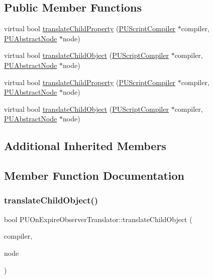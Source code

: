 \subsection*{Public Member Functions}
\begin{DoxyCompactItemize}
\item 
virtual bool \hyperlink{classPUOnExpireObserverTranslator_a5c9aebce494bfb736157931378f244a3}{translate\+Child\+Property} (\hyperlink{classPUScriptCompiler}{P\+U\+Script\+Compiler} $\ast$compiler, \hyperlink{classPUAbstractNode}{P\+U\+Abstract\+Node} $\ast$node)
\item 
virtual bool \hyperlink{classPUOnExpireObserverTranslator_ab390167f2b9750f6d6997c9c8fd87987}{translate\+Child\+Object} (\hyperlink{classPUScriptCompiler}{P\+U\+Script\+Compiler} $\ast$compiler, \hyperlink{classPUAbstractNode}{P\+U\+Abstract\+Node} $\ast$node)
\item 
virtual bool \hyperlink{classPUOnExpireObserverTranslator_aa547f9b3336637066998681d720af51e}{translate\+Child\+Property} (\hyperlink{classPUScriptCompiler}{P\+U\+Script\+Compiler} $\ast$compiler, \hyperlink{classPUAbstractNode}{P\+U\+Abstract\+Node} $\ast$node)
\item 
virtual bool \hyperlink{classPUOnExpireObserverTranslator_a5f14260b1fa1af6eea3a77904cec71f1}{translate\+Child\+Object} (\hyperlink{classPUScriptCompiler}{P\+U\+Script\+Compiler} $\ast$compiler, \hyperlink{classPUAbstractNode}{P\+U\+Abstract\+Node} $\ast$node)
\end{DoxyCompactItemize}
\subsection*{Additional Inherited Members}


\subsection{Member Function Documentation}
\mbox{\label{classPUOnExpireObserverTranslator_ab390167f2b9750f6d6997c9c8fd87987}} 
\subsubsection{\texorpdfstring{translate\+Child\+Object()}{translateChildObject()}\hspace{0.1cm}{\footnotesize\ttfamily [1/2]}}
{\footnotesize\ttfamily bool P\+U\+On\+Expire\+Observer\+Translator\+::translate\+Child\+Object (\begin{DoxyParamCaption}\item[{\hyperlink{classPUScriptCompiler}{P\+U\+Script\+Compiler} $\ast$}]{compiler,  }\item[{\hyperlink{classPUAbstractNode}{P\+U\+Abstract\+Node} $\ast$}]{node }\end{DoxyParamCaption})\hspace{0.3cm}{\ttfamily [virtual]}}

